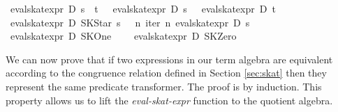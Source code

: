 \documentclass{llncs}
\begin{document}
\begin{isabellebody}
{}\ {}eval{}skat{}expr\ D\ {}s\ {}{}{}\ t{}\ {}\ {}\ eval{}skat{}expr\ D\ s\ {}\ {}\ eval{}skat{}expr\ D\ t\ {}{}\isanewline
{}\ {}eval{}skat{}expr\ D\ {}SKStar\ s{}\ {}\ {}\ {}{}n{}\ iter\ n\ {}eval{}skat{}expr\ D\ s{}\ {}{}{}\isanewline
{}\ {}eval{}skat{}expr\ D\ SKOne\ {}\ {}\ {}{}\isanewline
{}\ {}eval{}skat{}expr\ D\ SKZero\ {}\ {}\ {}{}{}\isanewline
\end{isabellebody}

We can now prove that if two expressions in our term algebra are
equivalent according to the congruence relation defined in Section
\ref{sec:skat} then they represent the same predicate transformer. The
proof is by induction. This property allows us to lift the
\textit{eval-skat-expr} function to the quotient algebra.
\end{document}

